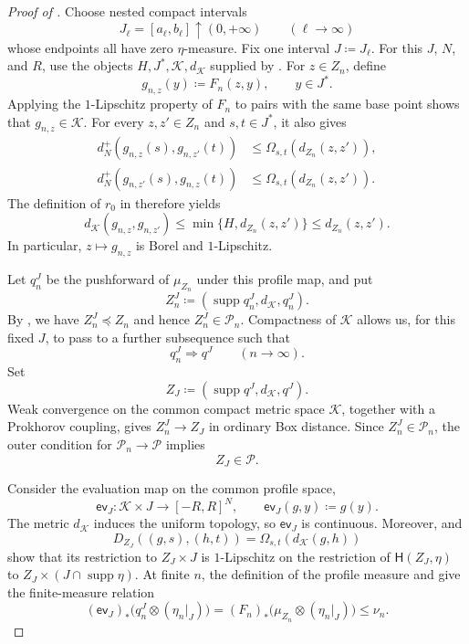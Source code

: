 \documentclass{amsart}
\numberwithin{equation}{section}
\theoremstyle{plain}
\theoremstyle{definition}
\theoremstyle{remark}
\DeclareMathOperator{\supp}{supp}
\begin{document}
\begin{proof}[Proof of ]
Choose nested compact intervals
\[
 J_\ell=[a_\ell,b_\ell]\uparrow(0,+\infty)
 \qquad(\ell\to\infty)
\]
whose endpoints all have zero $\eta$-measure.  Fix one interval $J\coloneqq J_\ell$.  For this $J$, $N$, and $R$,
use the objects $H,J^*,\mathscr K,d_{\mathscr K}$ supplied by .  For $z\in Z_n$,
define
\[
 g_{n,z}(y)\coloneqq F_n(z,y),
 \qquad y\in J^*.
\]
Applying the $1$-Lipschitz property of $F_n$ to pairs with the same base point shows that
$g_{n,z}\in\mathscr K$.  For every $z,z'\in Z_n$ and $s,t\in J^*$, it also gives
\[
 \begin{aligned}
 d_N^+(g_{n,z}(s),g_{n,z'}(t))
 &\le\Omega_{s,t}(d_{Z_n}(z,z')),\\
 d_N^+(g_{n,z'}(s),g_{n,z}(t))
 &\le\Omega_{s,t}(d_{Z_n}(z,z')).
 \end{aligned}
\]
The definition of $r_0$ in  therefore yields
\begin{equation}\label{eq:joint-profile-factor-map}
 d_{\mathscr K}(g_{n,z},g_{n,z'})
 \le\min\{H,d_{Z_n}(z,z')\}
 \le d_{Z_n}(z,z').
\end{equation}
In particular, $z\mapsto g_{n,z}$ is Borel and $1$-Lipschitz.

Let $q_n^J$ be the pushforward of $\mu_{Z_n}$ under this profile map, and put
\[
 Z_n^J\coloneqq(\supp q_n^J,d_{\mathscr K},q_n^J).
\]
By , we have $Z_n^J\preceq Z_n$ and hence $Z_n^J\in\mathcal P_n$.  Compactness
of $\mathscr K$ allows us, for this fixed $J$, to pass to a further subsequence such that
\[
 q_n^J\Rightarrow q^J
 \qquad(n\to\infty).
\]
Set
\[
 Z_J\coloneqq(\supp q^J,d_{\mathscr K},q^J).
\]
Weak convergence on the common compact metric space $\mathscr K$, together with a Prokhorov coupling, gives
$Z_n^J\to Z_J$ in ordinary Box distance.  Since $Z_n^J\in\mathcal P_n$, the outer condition for
$\mathcal P_n\to\mathcal P$ implies
\begin{equation}\label{eq:joint-profile-limit-base}
 Z_J\in\mathcal P.
\end{equation}

Consider the evaluation map on the common profile space,
\[
 \mathsf{ev}_J\colon\mathscr K\times J\longrightarrow[-R,R]^N,
 \qquad \mathsf{ev}_J(g,y)\coloneqq g(y).
\]
The metric $d_{\mathscr K}$ induces the uniform topology, so $\mathsf{ev}_J$ is continuous.  Moreover,
 and
\[
 D_{Z_J}((g,s),(h,t))=\Omega_{s,t}(d_{\mathscr K}(g,h))
\]
show that its restriction to $Z_J\times J$ is $1$-Lipschitz on the restriction of $\mathsf H(Z_J,\eta)$ to
$Z_J\times(J\cap\supp\eta)$.  At finite $n$, the definition of the profile measure and
 give the finite-measure relation
\begin{equation}\label{eq:joint-profile-submeasure-finite}
 (\mathsf{ev}_J)_*\bigl(q_n^J\otimes(\eta_n|_J)\bigr)
 =(F_n)_*\bigl(\mu_{Z_n}\otimes(\eta_n|_J)\bigr)
 \le\nu_n.
\end{equation}


\end{proof}
\end{document}
